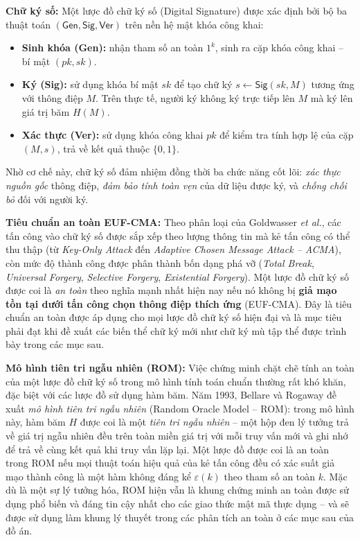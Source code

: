 \textbf{Chữ ký số:} Một lược đồ chữ ký số (Digital Signature) được xác định bởi bộ ba thuật toán $(\textsf{Gen}, \textsf{Sig}, \textsf{Ver})$ trên nền hệ mật khóa công khai:

\begin{itemize}
    \item \textbf{Sinh khóa (\textsf{Gen}):} nhận tham số an toàn $1^k$, sinh ra cặp khóa công khai -- bí mật $(pk, sk)$.

    \item \textbf{Ký (\textsf{Sig}):} sử dụng khóa bí mật $sk$ để tạo chữ ký $s \leftarrow \textsf{Sig}(sk, M)$ tương ứng với thông điệp $M$. Trên thực tế, người ký không ký trực tiếp lên $M$ mà ký lên giá trị băm $H(M)$.

    \item \textbf{Xác thực (\textsf{Ver}):} sử dụng khóa công khai $pk$ để kiểm tra tính hợp lệ của cặp $(M, s)$, trả về kết quả thuộc $\{0, 1\}$.
\end{itemize}

Nhờ cơ chế này, chữ ký số đảm nhiệm đồng thời ba chức năng cốt lõi: \textit{xác thực nguồn gốc} thông điệp, \textit{đảm bảo tính toàn vẹn} của dữ liệu được ký, và \textit{chống chối bỏ} đối với người ký.

\textbf{Tiêu chuẩn an toàn EUF-CMA:} Theo phân loại của Goldwasser \textit{et al.}, các tấn công vào chữ ký số được sắp xếp theo lượng thông tin mà kẻ tấn công có thể thu thập (từ \textit{Key-Only Attack} đến \textit{Adaptive Chosen Message Attack -- ACMA}), còn mức độ thành công được phân thành bốn dạng phá vỡ (\textit{Total Break}, \textit{Universal Forgery}, \textit{Selective Forgery}, \textit{Existential Forgery}). Một lược đồ chữ ký số được coi là \textit{an toàn} theo nghĩa mạnh nhất hiện nay nếu nó không bị \textbf{giả mạo tồn tại dưới tấn công chọn thông điệp thích ứng} (EUF-CMA). Đây là tiêu chuẩn an toàn được áp dụng cho mọi lược đồ chữ ký số hiện đại và là mục tiêu phải đạt khi đề xuất các biến thể chữ ký mới như chữ ký mù tập thể được trình bày trong các mục sau.

\textbf{Mô hình tiên tri ngẫu nhiên (ROM):} Việc chứng minh chặt chẽ tính an toàn của một lược đồ chữ ký số trong mô hình tính toán chuẩn thường rất khó khăn, đặc biệt với các lược đồ sử dụng hàm băm. Năm 1993, Bellare và Rogaway đề xuất \textit{mô hình tiên tri ngẫu nhiên} (Random Oracle Model -- ROM): trong mô hình này, hàm băm $H$ được coi là một \textit{tiên tri ngẫu nhiên} -- một hộp đen lý tưởng trả về giá trị ngẫu nhiên đều trên toàn miền giá trị với mỗi truy vấn mới và ghi nhớ để trả về cùng kết quả khi truy vấn lặp lại. Một lược đồ được coi là an toàn trong ROM nếu mọi thuật toán hiệu quả của kẻ tấn công đều có xác suất giả mạo thành công là một hàm không đáng kể $\varepsilon(k)$ theo tham số an toàn $k$. Mặc dù là một sự lý tưởng hóa, ROM hiện vẫn là khung chứng minh an toàn được sử dụng phổ biến và đáng tin cậy nhất cho các giao thức mật mã thực dụng -- và sẽ được sử dụng làm khung lý thuyết trong các phân tích an toàn ở các mục sau của đồ án.

